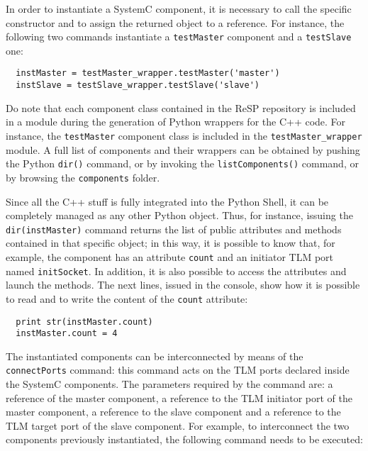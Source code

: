 \indent In order to instantiate a SystemC component, it is necessary to call the specific constructor and to assign the returned object to a reference. For instance, the following two commands instantiate a \texttt{testMaster} component and a \texttt{testSlave} one:

\scriptsize
\begin{verbatim}
  instMaster = testMaster_wrapper.testMaster('master')
  instSlave = testSlave_wrapper.testSlave('slave')
\end{verbatim}
\normalsize

Do note that each component class contained in the ReSP repository is included in a module during the generation of Python wrappers for the C++ code. For instance, the \texttt{testMaster} component class is included in the \texttt{testMaster\_wrapper} module. A full list of components and their wrappers can be obtained by pushing the Python \texttt{dir()} command, or by invoking the \texttt{listComponents()} command, or by browsing the \texttt{components} folder.

\indent Since all the C++ stuff is fully integrated into the Python Shell, it can be completely managed as any other Python object. Thus, for instance, issuing the \texttt{dir(instMaster)} command returns the list of public attributes and methods contained in that specific object; in this way, it is possible to know that, for example, the component has an attribute \texttt{count} and an initiator TLM port named \texttt{initSocket}. In addition, it is also possible to access the attributes and launch the methods. The next lines, issued in the console, show how it is possible to read and to write the content of the \texttt{count} attribute:

\scriptsize
\begin{verbatim}
  print str(instMaster.count)
  instMaster.count = 4
\end{verbatim}
\normalsize

\indent The instantiated components can be interconnected by means of the \linebreak \texttt{connectPorts} command: this command acts on the TLM ports declared inside the SystemC components. The parameters required by the command are: a reference of the master component, a reference to the TLM initiator port of the master component, a reference to the slave component and a reference to the TLM target port of the slave component. For example, to interconnect the two components previously instantiated, the following command needs to be executed:

